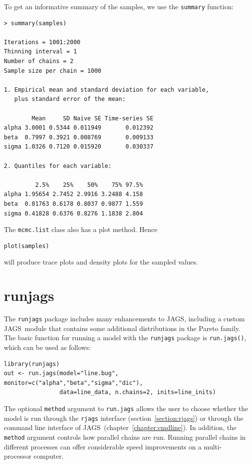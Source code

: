 \documentclass[11pt, a4paper, titlepage]{report}
\newcommand{\JAGS}{\textsf{JAGS}}
\begin{document}
To get an informative summary of the samples, we use the
\texttt{summary} function:
\begin{verbatim}
> summary(samples)

Iterations = 1001:2000
Thinning interval = 1 
Number of chains = 2 
Sample size per chain = 1000 

1. Empirical mean and standard deviation for each variable,
   plus standard error of the mean:

        Mean     SD Naive SE Time-series SE
alpha 3.0001 0.5344 0.011949       0.012392
beta  0.7997 0.3921 0.008769       0.009133
sigma 1.0326 0.7120 0.015920       0.030337

2. Quantiles for each variable:

         2.5%    25%    50%    75% 97.5%
alpha 1.95654 2.7452 2.9916 3.2488 4.158
beta  0.01763 0.6178 0.8037 0.9877 1.559
sigma 0.41828 0.6376 0.8276 1.1838 2.804
\end{verbatim}
The \texttt{mcmc.list} class also has a plot method. Hence
\begin{verbatim}
plot(samples)
\end{verbatim}
will produce trace plots and density plots for the sampled values.

\section{runjags}

The \texttt{runjags} package \citep{Denwood2016} includes many
enhancements to \JAGS, including a custom \JAGS\ module that contains
some additional distributions in the Pareto family. The basic function for 
running a model with the \texttt{runjags} package is \texttt{run.jags()}, 
which can be used as follows:
\begin{verbatim}
library(runjags)
out <- run.jags(model="line.bug", monitor=c("alpha","beta","sigma","dic"),
                data=line_data, n.chains=2, inits=line_inits)
\end{verbatim}
The optional \texttt{method} argument to \texttt{run.jags} allows the
user to choose whether the model is run through the \texttt{rjags}
interface (section~\ref{section:rjags}) or through the command line
interface of \JAGS\ (chapter~\ref{chapter:cmdline}). In addition, the
\texttt{method} argument controls how parallel chains are run. Running
parallel chains in different processes can offer considerable speed
improvements on a multi-processor computer.
\end{document}
